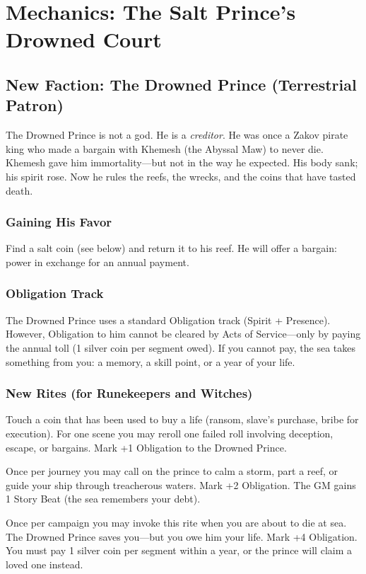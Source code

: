 \documentclass[12pt]{article}
\begin{document}
\section*{Mechanics: The Salt Prince’s Drowned Court}
\label{sec:mechanics}

\subsection{New Faction: The Drowned Prince (Terrestrial Patron)}
The Drowned Prince is not a god. He is a \textit{creditor}. He was once a Zakov pirate king who made a bargain with Khemesh (the Abyssal Maw) to never die. Khemesh gave him immortality—but not in the way he expected. His body sank; his spirit rose. Now he rules the reefs, the wrecks, and the coins that have tasted death.

\subsubsection{Gaining His Favor}
Find a salt coin (see below) and return it to his reef. He will offer a bargain: power in exchange for an annual payment.

\subsubsection{Obligation Track}
The Drowned Prince uses a standard Obligation track (Spirit + Presence). However, Obligation to him cannot be cleared by Acts of Service—only by paying the annual toll (1 silver coin per segment owed). If you cannot pay, the sea takes something from you: a memory, a skill point, or a year of your life.

\subsubsection{New Rites (for Runekeepers and Witches)}
\begin{description}[leftmargin=!,labelwidth=\widthof{\bfseries High}]
  \item[Salt Coin’s Toll (Low, 4 XP)] Touch a coin that has been used to buy a life (ransom, slave’s purchase, bribe for execution). For one scene you may reroll one failed roll involving deception, escape, or bargains. Mark +1 Obligation to the Drowned Prince.
  \item[Drowned Prince’s Favor (Standard, 8 XP)] Once per journey you may call on the prince to calm a storm, part a reef, or guide your ship through treacherous waters. Mark +2 Obligation. The GM gains 1 Story Beat (the sea remembers your debt).
  \item[The Interest Comes Due (High, 12 XP)] Once per campaign you may invoke this rite when you are about to die at sea. The Drowned Prince saves you—but you owe him your life. Mark +4 Obligation. You must pay 1 silver coin per segment within a year, or the prince will claim a loved one instead.
\end{description}
\end{document}
